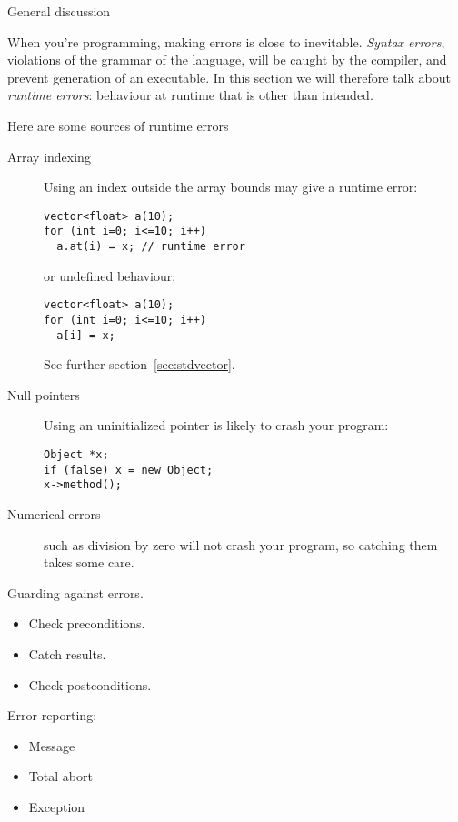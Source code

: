 
 {General discussion}

When you're programming, making errors is close to inevitable.
%
\emph{Syntax errors}, violations of the grammar of
the language, will be caught by the compiler, and prevent generation
of an executable. In this section we will therefore talk about
%
\emph{runtime errors}: behaviour at runtime that
is other than intended.

Here are some sources of runtime errors
\begin{description}
\item[Array indexing] Using an index outside the array bounds may give
  a runtime error:
\begin{verbatim}
vector<float> a(10);
for (int i=0; i<=10; i++)
  a.at(i) = x; // runtime error
\end{verbatim}
or undefined behaviour:
\begin{verbatim}
vector<float> a(10);
for (int i=0; i<=10; i++)
  a[i] = x;
\end{verbatim}
See further section~\ref{sec:stdvector}.
\item[Null pointers] Using an uninitialized pointer is likely to crash
  your program:
\begin{verbatim}
Object *x;
if (false) x = new Object;
x->method();
\end{verbatim}
\item[Numerical errors] such as division by zero will not crash your
  program, so catching them takes some care.
\end{description}

Guarding against errors.
\begin{itemize}
\item Check preconditions.
\item Catch results.
\item Check postconditions.
\end{itemize}

Error reporting:
\begin{itemize}
\item Message
\item Total abort
\item Exception
\end{itemize}


